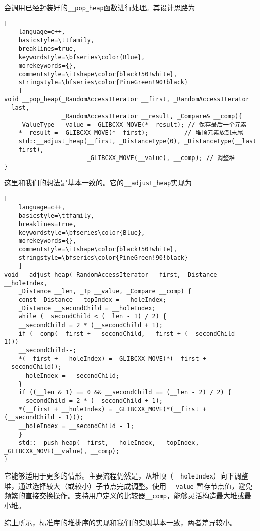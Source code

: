 \documentclass[UTF8]{ctexart}
\begin{document}
会调用已经封装好的\texttt{\_\_pop\_heap}函数进行处理。其设计思路为
\begin{lstlisting}[ 
    language=c++,
    basicstyle=\ttfamily,
    breaklines=true,
    keywordstyle=\bfseries\color{Blue}, 
    morekeywords={}, 
    commentstyle=\itshape\color{black!50!white},
    stringstyle=\bfseries\color{PineGreen!90!black} 
    ]
void __pop_heap(_RandomAccessIterator __first, _RandomAccessIterator __last,
                _RandomAccessIterator __result, _Compare& __comp){
    _ValueType __value = _GLIBCXX_MOVE(*__result); // 保存最后一个元素
    *__result = _GLIBCXX_MOVE(*__first);          // 堆顶元素放到末尾
    std::__adjust_heap(__first, _DistanceType(0), _DistanceType(__last - __first),
                       _GLIBCXX_MOVE(__value), __comp); // 调整堆
}
\end{lstlisting}

这里和我们的想法是基本一致的。它的\texttt{\_\_adjust\_heap}实现为
\begin{lstlisting}[ 
    language=c++,
    basicstyle=\ttfamily,
    breaklines=true,
    keywordstyle=\bfseries\color{Blue}, 
    morekeywords={}, 
    commentstyle=\itshape\color{black!50!white},
    stringstyle=\bfseries\color{PineGreen!90!black} 
    ]
void __adjust_heap(_RandomAccessIterator __first, _Distance __holeIndex,
    _Distance __len, _Tp __value, _Compare __comp) {
    const _Distance __topIndex = __holeIndex;
    _Distance __secondChild = __holeIndex;
    while (__secondChild < (__len - 1) / 2) {
    __secondChild = 2 * (__secondChild + 1);
    if (__comp(__first + __secondChild, __first + (__secondChild - 1)))
    __secondChild--;
    *(__first + __holeIndex) = _GLIBCXX_MOVE(*(__first + __secondChild));
    __holeIndex = __secondChild;
    }
    if ((__len & 1) == 0 && __secondChild == (__len - 2) / 2) {
    __secondChild = 2 * (__secondChild + 1);
    *(__first + __holeIndex) = _GLIBCXX_MOVE(*(__first + (__secondChild - 1)));
    __holeIndex = __secondChild - 1;
    }
    std::__push_heap(__first, __holeIndex, __topIndex, _GLIBCXX_MOVE(__value), __comp);
}
\end{lstlisting}

它能够适用于更多的情形。主要流程仍然是，从堆顶（\texttt{\_\_holeIndex}）向下调整堆，通过选择较大（或较小）子节点完成调整。使用 \texttt{\_\_value} 暂存节点值，避免频繁的直接交换操作。支持用户定义的比较器\texttt{\_\_comp}，能够灵活构造最大堆或最小堆。

综上所示，标准库的堆排序的实现和我们的实现基本一致，两者差异较小。
\end{document}
